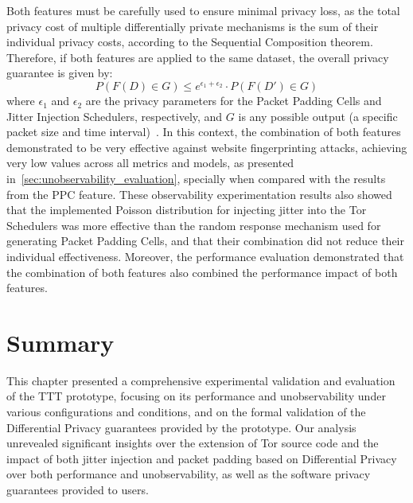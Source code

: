 
Both features must be carefully used to ensure minimal privacy loss, as the total privacy cost of multiple differentially private mechanisms is the sum of their individual privacy costs, according to the Sequential Composition theorem. Therefore, if both features are applied to the same dataset, the overall privacy guarantee is given by:
\[P(F(D) \in G) \leq e^{\epsilon_1 + \epsilon_2} \cdot P(F(D') \in G)\]
where $\epsilon_1$ and $\epsilon_2$ are the privacy parameters for the Packet Padding Cells and Jitter Injection Schedulers, respectively, and $G$ is any possible output (a specific packet size and time interval)~\cite{DP_Book, AlgFoundationsDP}.
In this context, the combination of both features demonstrated to be very effective against website fingerprinting attacks, achieving very low values across all metrics and models, as presented in~\autoref{sec:unobservability_evaluation}, specially when compared with the results from the PPC feature.
These observability experimentation results also showed that the implemented Poisson distribution for injecting jitter into the Tor Schedulers was more effective than the random response mechanism used for generating Packet Padding Cells, and that their combination did not reduce their individual effectiveness.
Moreover, the performance evaluation demonstrated that the combination of both features also combined the performance impact of both features. 

\section{Summary}\label{sec:validation_summary} %

This chapter presented a comprehensive experimental validation and evaluation of the TTT prototype, focusing on its performance and unobservability under various configurations and conditions, and on the formal validation of the Differential Privacy guarantees provided by the prototype. Our analysis unrevealed significant insights over the extension of Tor source code and the impact of both jitter injection and packet padding based on Differential Privacy over both performance and unobservability, as well as the software privacy guarantees provided to users. 

